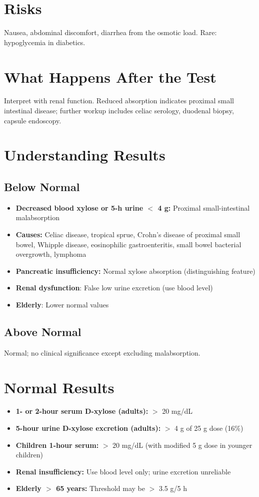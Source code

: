 \section*{Risks}
Nausea, abdominal discomfort, diarrhea from the osmotic load. Rare: hypoglycemia in diabetics.

\section*{What Happens After the Test}
Interpret with renal function. Reduced absorption indicates proximal small intestinal disease; further workup includes celiac serology, duodenal biopsy, capsule endoscopy.

\section*{Understanding Results}

\subsection*{Below Normal}
\begin{itemize}
  \item \textbf{Decreased blood xylose or 5-h urine $<$ 4 g:} Proximal small-intestinal malabsorption
  \item \textbf{Causes:} Celiac disease, tropical sprue, Crohn's disease of proximal small bowel, Whipple disease, eosinophilic gastroenteritis, small bowel bacterial overgrowth, lymphoma
  \item \textbf{Pancreatic insufficiency:} Normal xylose absorption (distinguishing feature)
  \item \textbf{Renal dysfunction}: False low urine excretion (use blood level)
  \item \textbf{Elderly}: Lower normal values
\end{itemize}

\subsection*{Above Normal}
Normal; no clinical significance except excluding malabsorption.

\section*{Normal Results}
\begin{itemize}
  \item \textbf{1- or 2-hour serum D-xylose (adults):} $>$ 20 mg/dL
  \item \textbf{5-hour urine D-xylose excretion (adults):} $>$ 4 g of 25 g dose (16\%)
  \item \textbf{Children 1-hour serum:} $>$ 20 mg/dL (with modified 5 g dose in younger children)
  \item \textbf{Renal insufficiency:} Use blood level only; urine excretion unreliable
  \item \textbf{Elderly $>$ 65 years:} Threshold may be $>$ 3.5 g/5 h
\end{itemize}

